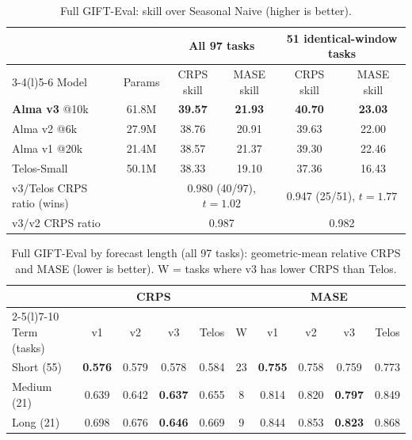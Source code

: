 \documentclass[10pt,a4paper]{extarticle}
\begin{document}
\begin{table}[H]
\centering\small
\caption{Full GIFT-Eval: skill over Seasonal Naive (higher is better).}
\label{tab:gift}
\begin{tabular}{@{}lc cc cc@{}}
\toprule
 & & \multicolumn{2}{c}{All 97 tasks} & \multicolumn{2}{c}{51 identical-window tasks} \\
\cmidrule(lr){3-4}\cmidrule(l){5-6}
Model & Params & CRPS skill & MASE skill & CRPS skill & MASE skill \\
\midrule
\textbf{Alma v3} @10k & 61.8M & \textbf{39.57} & \textbf{21.93} & \textbf{40.70} & \textbf{23.03} \\
Alma v2 @6k & 27.9M & 38.76 & 20.91 & 39.63 & 22.00 \\
Alma v1 @20k & 21.4M & 38.57 & 21.37 & 39.30 & 22.46 \\
Telos-Small & 50.1M & 38.33 & 19.10 & 37.36 & 16.43 \\
\midrule
v3/Telos CRPS ratio (wins) & & \multicolumn{2}{c}{0.980 (40/97), $t=1.02$} & \multicolumn{2}{c}{0.947 (25/51), $t=1.77$} \\
v3/v2 CRPS ratio & & \multicolumn{2}{c}{0.987} & \multicolumn{2}{c}{0.982} \\
\bottomrule
\end{tabular}
\end{table}

\begin{table}[H]
\centering\small
\caption{Full GIFT-Eval by forecast length (all 97 tasks): geometric-mean relative CRPS and MASE (lower is better).
W = tasks where v3 has lower CRPS than Telos.}
\label{tab:gift_term}
\setlength{\tabcolsep}{3.5pt}
\begin{tabular}{@{}l cccc c cccc@{}}
\toprule
 & \multicolumn{4}{c}{CRPS} & & \multicolumn{4}{c}{MASE} \\
\cmidrule(lr){2-5}\cmidrule(l){7-10}
Term (tasks) & v1 & v2 & v3 & Telos & W & v1 & v2 & v3 & Telos \\
\midrule
Short (55) & \textbf{0.576} & 0.579 & 0.578 & 0.584 & 23 & \textbf{0.755} & 0.758 & 0.759 & 0.773 \\
Medium (21) & 0.639 & 0.642 & \textbf{0.637} & 0.655 & 8 & 0.814 & 0.820 & \textbf{0.797} & 0.849 \\
Long (21) & 0.698 & 0.676 & \textbf{0.646} & 0.669 & 9 & 0.844 & 0.853 & \textbf{0.823} & 0.868 \\
\bottomrule
\end{tabular}
\end{table}
\end{document}

